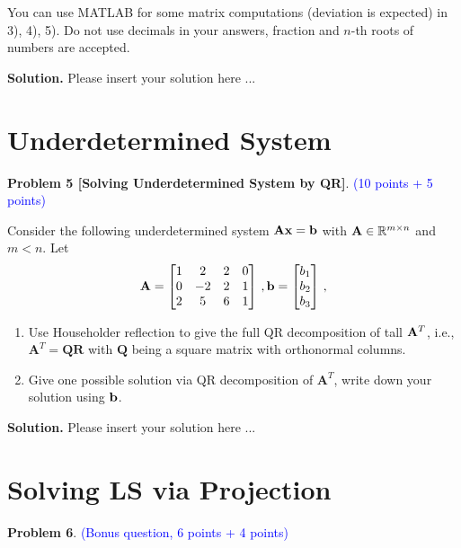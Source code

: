 \documentclass[english,onecolumn]{IEEEtran}
\def\Q{\mathbf{Q}}
\def\A{\mathbf{A}}
\def\R{\mathbf{R}}
\begin{document}
 You can use MATLAB for some matrix computations (deviation is expected) in 3), 4), 5).
Do not use decimals in your answers, fraction and $n$-th roots of numbers are accepted.

\noindent
\textbf{Solution.}
Please insert your solution here ...



\newpage
\section{Underdetermined System}

\noindent\textbf{Problem 5 [Solving Underdetermined System by QR]}. \textcolor{blue}{(10 points + 5 points)}

Consider the following underdetermined system ${\bf Ax}={\bf b}$ with ${\bf A}\in \mathbb{R}^{m\times n}$ and $m<n$. Let 
    \[
    {\bf A}=
    \begin{bmatrix}
         1&2&2&0\\
         0&-2&2&1\\
         2&5&6&1
    \end{bmatrix}\,,
    {\bf b}=
    \begin{bmatrix}
        b_1\\b_2\\b_3
    \end{bmatrix}\,,
    \]
\begin{enumerate}
    \item Use Householder reflection to give the full QR decomposition of tall ${\bf A}^T$, i.e., $\A^T= \Q\R$ with $\Q$ being a square matrix with orthonormal columns.
    \item Give one possible solution via QR decomposition of $\A^T$, write down your solution using $\bf{b}$.
\end{enumerate}
\noindent
\textbf{Solution.}
Please insert your solution here ...

\newpage
\section{Solving LS via Projection}
\noindent\textbf{Problem 6}. \textcolor{blue}{(Bonus question, 6 points + 4 points)}
\end{document}
